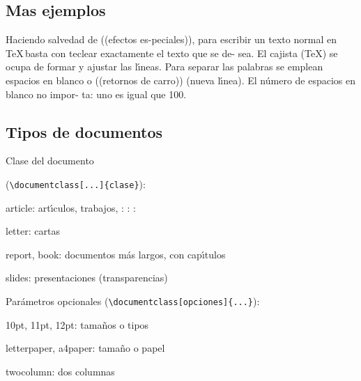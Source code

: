 \subsection{Mas ejemplos}

\begin{example}
Haciendo salvedad de ((efectos es-peciales)),
para escribir un texto
normal en \TeX \,basta con teclear
exactamente el texto que se de-
sea. El cajista (\TeX) se ocupa de
formar y ajustar las l\'{\i}neas. Para
separar las palabras se emplean
espacios en blanco o ((retornos de
carro)) (nueva l\'{\i}nea). El n\'{u}mero
de espacios en blanco no impor-
ta: uno es igual que                100.
\end{example}
\subsection{Tipos de documentos}
\begin{description}
\item[$\blacksquare$] Clase del documento
\item (\lstinline+\documentclass[...]{clase}+):

\item[$\bigstar$]  article: art\'{\i}culos, trabajos, : : :

\item[$\bigstar$]  letter: cartas

\item[$\bigstar$]  report, book: documentos m\'{a}s largos, con cap\'{\i}tulos

\item[$\bigstar$]  slides: presentaciones (transparencias)
\item[$\blacksquare$] Par\'{a}metros opcionales (\lstinline+\documentclass[opciones]{...}+):
\end{description}

10pt, 11pt, 12pt: tama\~{n}os o tipos

letterpaper, a4paper:  tama\~{n}o o papel

twocolumn: dos columnas

